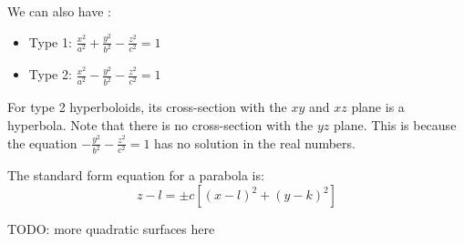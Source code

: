 We can also have :
\begin{itemize}
    \item Type 1: $\frac{x^2}{a^2} + \frac{y^2}{b^2} - \frac{z^2}{c^2} = 1$
    \item Type 2: $\frac{x^2}{a^2} - \frac{y^2}{b^2} - \frac{z^2}{c^2} = 1$
\end{itemize}

For type 2 hyperboloids, its cross-section with the $xy$ and $xz$ plane is a hyperbola. Note that there is no cross-section with the $yz$ plane. This is because the equation $- \frac{y^2}{b^2} - \frac{z^2}{c^2} = 1$ has no solution in the real numbers.

The standard form equation for a parabola is:
\[ z - l = \pm c \left[ (x-l)^2 + (y-k)^2 \right] \]

TODO: more quadratic surfaces here
